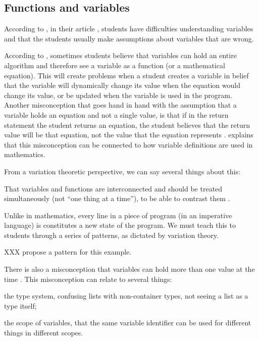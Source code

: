 \subsection{Functions and variables}

According to \textcite{MisconceptionsSurvey2017}, in their article 
, students have difficulties understanding 
variables and that the students usually make assumptions about variables that 
are wrong.

According to \textcite{Kohn2017VariableEvaluation,Plass2015Variables,Doukakis2007}, 
sometimes students believe that variables can hold an entire algorithm and 
therefore see a variable as a function (or a mathematical equation). This will 
create problems when a student creates a variable in belief that the variable 
will dynamically change its value when the equation would change its value, or be updated
when the variable is used in the program. Another misconception that goes hand in hand with the assumption that a 
variable holds an equation and not a single value, is that if in the return 
statement the student returns an equation, the student believes that the return 
value will be that equation, not the value that the equation represents 
\parencite{Kohn2017VariableEvaluation}.
\Textcite{Kohn2017VariableEvaluation} explains that this misconception can be 
connected to how variable definitions are used in mathematics. 

From a variation theoretic perspective, we can say several things about this:
\begin{enumerate*}
  \item That variables and functions are interconnected and should be treated 
    simultaneously (not \enquote{one thing at a time}), to be able to contrast 
    them \parencite[\cf][Ch~6, pp~167--168]{NCOL}.
  \item Unlike in mathematics, every line in a piece of program (in an 
    imperative language) is constitutes a new state of the program.
    We must teach this to students through a series of patterns, as dictated by 
    variation theory.
\end{enumerate*}

XXX propose a pattern for this example.

There is also a misconception that variables can hold more than one value at 
the time \parencite{Doukakis2007}.
This misconception can relate to several things:
\begin{enumerate*}
  \item the type system, confusing lists with non-container types, not seeing a 
    list as a type itself;
  \item the scope of variables, that the same variable identifier can be used 
    for different things in different scopes.
\end{enumerate*}

